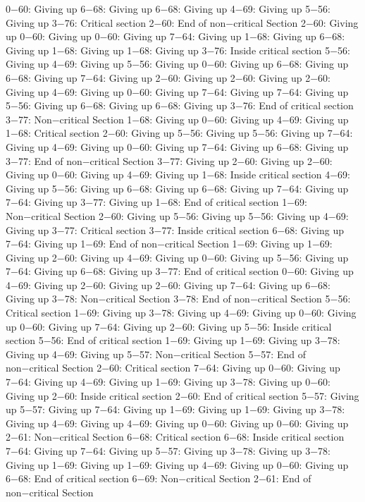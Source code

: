 0−60: Giving up
6−68: Giving up
6−68: Giving up
4−69: Giving up
5−56: Giving up
3−76: Critical section
2−60: End of non−critical Section
2−60: Giving up
0−60: Giving up
0−60: Giving up
7−64: Giving up
1−68: Giving up
6−68: Giving up
1−68: Giving up
1−68: Giving up
3−76: Inside critical section
5−56: Giving up
4−69: Giving up
5−56: Giving up
0−60: Giving up
6−68: Giving up
6−68: Giving up
7−64: Giving up
2−60: Giving up
2−60: Giving up
2−60: Giving up
4−69: Giving up
0−60: Giving up
7−64: Giving up
7−64: Giving up
5−56: Giving up
6−68: Giving up
6−68: Giving up
3−76: End of critical section
3−77: Non−critical Section
1−68: Giving up
0−60: Giving up
4−69: Giving up
1−68: Critical section
2−60: Giving up
5−56: Giving up
5−56: Giving up
7−64: Giving up
4−69: Giving up
0−60: Giving up
7−64: Giving up
6−68: Giving up
3−77: End of non−critical Section
3−77: Giving up
2−60: Giving up
2−60: Giving up
0−60: Giving up
4−69: Giving up
1−68: Inside critical section
4−69: Giving up
5−56: Giving up
6−68: Giving up
6−68: Giving up
7−64: Giving up
7−64: Giving up
3−77: Giving up
1−68: End of critical section
1−69: Non−critical Section
2−60: Giving up
5−56: Giving up
5−56: Giving up
4−69: Giving up
3−77: Critical section
3−77: Inside critical section
6−68: Giving up
7−64: Giving up
1−69: End of non−critical Section
1−69: Giving up
1−69: Giving up
2−60: Giving up
4−69: Giving up
0−60: Giving up
5−56: Giving up
7−64: Giving up
6−68: Giving up
3−77: End of critical section
0−60: Giving up
4−69: Giving up
2−60: Giving up
2−60: Giving up
7−64: Giving up
6−68: Giving up
3−78: Non−critical Section
3−78: End of non−critical Section
5−56: Critical section
1−69: Giving up
3−78: Giving up
4−69: Giving up
0−60: Giving up
0−60: Giving up
7−64: Giving up
2−60: Giving up
5−56: Inside critical section
5−56: End of critical section
1−69: Giving up
1−69: Giving up
3−78: Giving up
4−69: Giving up
5−57: Non−critical Section
5−57: End of non−critical Section
2−60: Critical section
7−64: Giving up
0−60: Giving up
7−64: Giving up
4−69: Giving up
1−69: Giving up
3−78: Giving up
0−60: Giving up
2−60: Inside critical section
2−60: End of critical section
5−57: Giving up
5−57: Giving up
7−64: Giving up
1−69: Giving up
1−69: Giving up
3−78: Giving up
4−69: Giving up
4−69: Giving up
0−60: Giving up
0−60: Giving up
2−61: Non−critical Section
6−68: Critical section
6−68: Inside critical section
7−64: Giving up
7−64: Giving up
5−57: Giving up
3−78: Giving up
3−78: Giving up
1−69: Giving up
1−69: Giving up
4−69: Giving up
0−60: Giving up
6−68: End of critical section
6−69: Non−critical Section
2−61: End of non−critical Section
